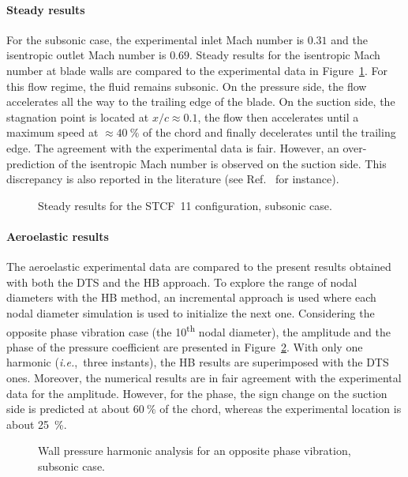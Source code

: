 
\paragraph{Steady results}

For the subsonic case, 
the experimental inlet Mach number is $0.31$ 
and the isentropic outlet Mach number is $0.69$.
Steady results for the isentropic Mach number at 
blade walls are compared to the experimental data in 
Figure~\ref{fig:stcf11_rans_subsonic}.  For this flow regime, the fluid
remains subsonic.
On the pressure side, the flow accelerates all the way
to the trailing edge of the blade. On the suction side, 
the stagnation point is located at $x / c \approx 0.1$,
the flow then
accelerates until a maximum speed at $\approx 40~\%$ of the chord and
finally decelerates until the trailing edge.
The agreement with the experimental data is fair. However, an
over-prediction of the isentropic Mach number is observed on the suction
side.  This discrepancy is also reported in the literature (see
Ref.~\cite{Fransson1999} for instance).

\begin{figure}[htp]
  \centering
  \caption{Steady results for the STCF~11 configuration, subsonic case.}
  \label{fig:stcf11_rans_subsonic}
\end{figure}

\paragraph{Aeroelastic results}

The aeroelastic experimental data are compared to the present results
obtained with both the DTS and the HB approach. To explore the range
of nodal diameters with the HB method, an incremental approach is used
where each nodal diameter simulation is used to initialize the next
one.  Considering the opposite phase vibration case (the 10\textsuperscript{th} nodal diameter), 
the amplitude and the phase of the pressure coefficient are
presented in Figure~\ref{fig:stcf11_ael_subsonic_ibpa_180_paper}.
With only one harmonic (\emph{i.e.},~three instants), the HB results
are superimposed with the DTS ones. Moreover, the numerical results are
in fair agreement with the experimental data for the
amplitude. However, for the phase, the sign change on the
suction side is predicted at about $60~\%$ of the chord, whereas the
experimental location is about 25~\%.
\begin{figure}[htp]
  \centering
  \caption{Wall pressure harmonic analysis for an opposite phase vibration, subsonic case.}
  \label{fig:stcf11_ael_subsonic_ibpa_180_paper}
\end{figure}


